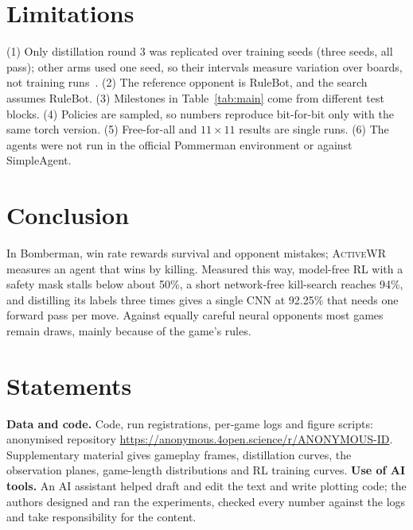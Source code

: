 \documentclass[journal]{IEEEtran}
\newcommand{\awr}{\textsc{ActiveWR}}
\begin{document}
\section{Limitations}
(1) Only distillation round 3 was replicated over training seeds (three seeds, all pass); other arms used one seed, so their intervals measure variation over boards, not training runs~\cite{henderson2018matters,agarwal2021precipice}. (2) The reference opponent is RuleBot, and the search assumes RuleBot. (3) Milestones in Table~\ref{tab:main} come from different test blocks. (4) Policies are sampled, so numbers reproduce bit-for-bit only with the same torch version. (5) Free-for-all and $11\times11$ results are single runs. (6) The agents were not run in the official Pommerman environment or against SimpleAgent.

\section{Conclusion}
In Bomberman, win rate rewards survival and opponent mistakes; \awr{} measures an agent that wins by killing. Measured this way, model-free RL with a safety mask stalls below about 50\%, a short network-free kill-search reaches 94\%, and distilling its labels three times gives a single CNN at 92.25\% that needs one forward pass per move. Against equally careful neural opponents most games remain draws, mainly because of the game's rules.

\section*{Statements}
\noindent\textbf{Data and code.} Code, run registrations, per-game logs and figure scripts: anonymised repository \url{https://anonymous.4open.science/r/ANONYMOUS-ID}. Supplementary material gives gameplay frames, distillation curves, the observation planes, game-length distributions and RL training curves.
\noindent\textbf{Use of AI tools.} An AI assistant helped draft and edit the text and write plotting code; the authors designed and ran the experiments, checked every number against the logs and take responsibility for the content.



\end{document}
